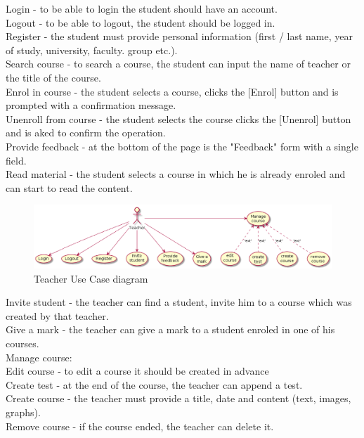 \documentclass[12pt,a4paper,titlepage]{article}
\newcommand\tab[1][1cm]{\hspace*{#1}}
\begin{document}
\noindent
Login - to be able to login the student should have an account.\\
Logout - to be able to logout, the student should be logged in.\\
Register - the student must provide personal information (first / last name, year of study, university, faculty. group etc.).\\
Search course - to search a course, the student can input the name of teacher or the title of the course.\\
Enrol in course - the student selects a course, clicks the [Enrol] button and is prompted with a confirmation message.\\
Unenroll from course - the student selects the course clicks the [Unenrol] button and is aked to confirm the operation.\\
Provide feedback - at the bottom of the page is the "Feedback" form with a single field.\\
Read material - the student selects a course in which he is already enroled and can start to read the content.

\clearpage

\begin{figure}[H]
\includegraphics[width=\textwidth]{teacher}
\caption{Teacher Use Case diagram}
\centering
\end{figure}

\noindent
Invite student - the teacher can find a student, invite him to a course which was created by that teacher.\\
Give a mark - the teacher can give a mark to a student enroled in one of his courses.\\
Manage course:\\
\tab Edit course - to edit a course it should be created in advance\\
\tab Create test - at the end of the course, the teacher can append a test.\\
\tab Create course - the teacher must provide a title, date and content (text, images, graphs).\\
\tab Remove course - if the course ended, the teacher can delete it.\\
\end{document}
